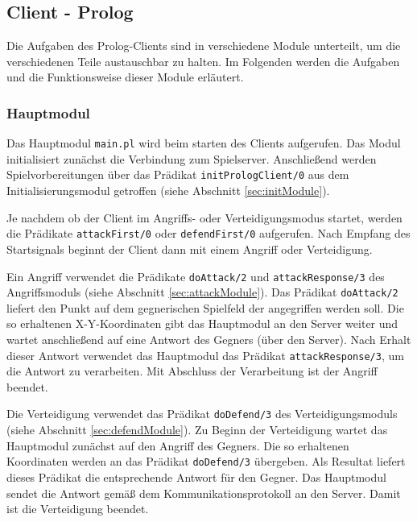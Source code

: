 \subsection{Client - Prolog} \label{sec:Prologclient}
	Die Aufgaben des Prolog-Clients sind in verschiedene Module unterteilt, um die verschiedenen Teile austauschbar zu halten. 
	Im Folgenden werden die Aufgaben und die Funktionsweise dieser Module erläutert.
	



\subsubsection{Hauptmodul} \label{sec:hauptmodul}
	Das Hauptmodul \texttt{main.pl} wird beim starten des Clients aufgerufen. Das Modul initialisiert zunächst die Verbindung zum
	Spielserver. Anschließend werden Spielvorbereitungen über das Prädikat \texttt{initPrologClient/0} aus dem 
	Initialisierungsmodul getroffen (siehe Abschnitt \ref{sec:initModule}).
	
	Je nachdem ob der Client im Angriffs- oder Verteidigungsmodus startet, werden die Prädikate \texttt{attackFirst/0} oder
	\texttt{defendFirst/0} aufgerufen. Nach Empfang des Startsignals beginnt der Client dann mit einem Angriff oder Verteidigung.
	
	Ein Angriff verwendet die Prädikate \texttt{doAttack/2} und \texttt{attackResponse/3} des Angriffsmoduls (siehe Abschnitt
	\ref{sec:attackModule}).
	Das Prädikat \texttt{doAttack/2} liefert den Punkt auf dem gegnerischen Spielfeld der angegriffen werden soll.
	Die so erhaltenen X-Y-Koordinaten gibt das Hauptmodul an den Server weiter und wartet anschließend auf eine Antwort des 
	Gegners (über den Server). 
	Nach Erhalt dieser Antwort verwendet das Hauptmodul das Prädikat \texttt{attackResponse/3}, um die Antwort zu verarbeiten.
	Mit Abschluss der Verarbeitung ist der Angriff beendet.
	
	Die Verteidigung verwendet das Prädikat \texttt{doDefend/3} des Verteidigungsmoduls (siehe Abschnitt \ref{sec:defendModule}).
	Zu Beginn der Verteidigung wartet das Hauptmodul zunächst auf den Angriff des Gegners. Die so erhaltenen Koordinaten
	werden an das Prädikat \texttt{doDefend/3} übergeben. Als Resultat liefert dieses Prädikat die entsprechende Antwort für den
	Gegner. Das Hauptmodul sendet die Antwort gemäß dem Kommunikationsprotokoll an den Server. Damit ist die Verteidigung 
	beendet.
	
